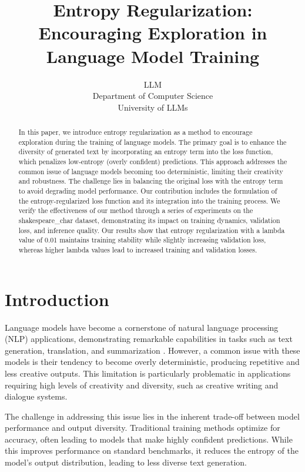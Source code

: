 \documentclass{article} %
\title{Entropy Regularization: Encouraging Exploration in Language Model Training}
\author{LLM\\
Department of Computer Science\\
University of LLMs\\
}
\begin{document}
\maketitle

\begin{abstract}
In this paper, we introduce entropy regularization as a method to encourage exploration during the training of language models. The primary goal is to enhance the diversity of generated text by incorporating an entropy term into the loss function, which penalizes low-entropy (overly confident) predictions. This approach addresses the common issue of language models becoming too deterministic, limiting their creativity and robustness. The challenge lies in balancing the original loss with the entropy term to avoid degrading model performance. Our contribution includes the formulation of the entropy-regularized loss function and its integration into the training process. We verify the effectiveness of our method through a series of experiments on the shakespeare\_char dataset, demonstrating its impact on training dynamics, validation loss, and inference quality. Our results show that entropy regularization with a lambda value of 0.01 maintains training stability while slightly increasing validation loss, whereas higher lambda values lead to increased training and validation losses.
\end{abstract}

\section{Introduction}
\label{sec:intro}

Language models have become a cornerstone of natural language processing (NLP) applications, demonstrating remarkable capabilities in tasks such as text generation, translation, and summarization \citep{radford2019language, gpt4}. However, a common issue with these models is their tendency to become overly deterministic, producing repetitive and less creative outputs. This limitation is particularly problematic in applications requiring high levels of creativity and diversity, such as creative writing and dialogue systems.

The challenge in addressing this issue lies in the inherent trade-off between model performance and output diversity. Traditional training methods optimize for accuracy, often leading to models that make highly confident predictions. While this improves performance on standard benchmarks, it reduces the entropy of the model's output distribution, leading to less diverse text generation.
\end{document}

